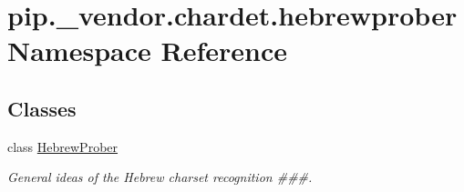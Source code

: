 \hypertarget{namespacepip_1_1__vendor_1_1chardet_1_1hebrewprober}{}\section{pip.\+\_\+vendor.\+chardet.\+hebrewprober Namespace Reference}
\label{namespacepip_1_1__vendor_1_1chardet_1_1hebrewprober}
\subsection*{Classes}
\begin{DoxyCompactItemize}
\item 
class \hyperlink{classpip_1_1__vendor_1_1chardet_1_1hebrewprober_1_1HebrewProber}{Hebrew\+Prober}
\begin{DoxyCompactList}\small\item\em General ideas of the Hebrew charset recognition \#\#\#. \end{DoxyCompactList}\end{DoxyCompactItemize}
